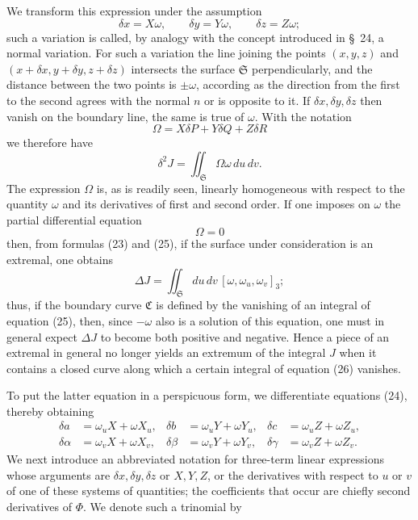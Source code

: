 \documentclass[11pt,a4paper,leqno]{article}
\begin{document}
We transform this expression under the assumption
\begin{equation}\tag{24}
\delta x=X\omega,\qquad \delta y=Y\omega,\qquad \delta z=Z\omega;
\end{equation}
such a variation is called, by analogy with the concept introduced in
\S~24, a normal variation. For such a variation the line joining the
points $(x,y,z)$ and $(x+\delta x,y+\delta y,z+\delta z)$ intersects the
surface $\mathfrak{S}$ perpendicularly, and the distance between the two
points is $\pm\omega$, according as the direction from the first to the
second agrees with the normal $n$ or is opposite to it. If
$\delta x,\delta y,\delta z$ then vanish on the boundary line, the same is
true of $\omega$. With the notation
\[
\Omega=X\delta P+Y\delta Q+Z\delta R
\]
we therefore have
\begin{equation}\tag{25}
\delta^2J=\iint_{\mathfrak{S}}\Omega\omega\,du\,dv.
\end{equation}
The expression $\Omega$ is, as is readily seen, linearly homogeneous with
respect to the quantity $\omega$ and its derivatives of first and second
order. If one imposes on $\omega$ the partial differential equation
\begin{equation}\tag{26}
\Omega=0
\end{equation}
then, from formulas (23) and (25), if the surface under consideration is an
extremal, one obtains
\[
\Delta J=\iint_{\mathfrak{S}}du\,dv\,[\omega,\omega_u,\omega_v]_3;
\]
thus, if the boundary curve $\mathfrak{C}$ is defined by the vanishing of
an integral of equation (25), then, since $-\omega$ also is a solution of
this equation, one must in general expect $\Delta J$ to become both
positive and negative. Hence a piece of an extremal in general no longer
yields an extremum of the integral $J$ when it contains a closed curve
along which a certain integral of equation (26) vanishes.

To put the latter equation in a perspicuous form, we differentiate equations
(24), thereby obtaining
\[
\begin{aligned}
\delta a&=\omega_uX+\omega X_u,&
\delta b&=\omega_uY+\omega Y_u,&
\delta c&=\omega_uZ+\omega Z_u,\\
\delta\alpha&=\omega_vX+\omega X_v,&
\delta\beta&=\omega_vY+\omega Y_v,&
\delta\gamma&=\omega_vZ+\omega Z_v.
\end{aligned}
\]
We next introduce an abbreviated notation for three-term linear expressions
whose arguments are $\delta x,\delta y,\delta z$ or $X,Y,Z$, or the
derivatives with respect to $u$ or $v$ of one of these systems of
quantities; the coefficients that occur are chiefly second derivatives of
$\Phi$. We denote such a trinomial by
\end{document}
